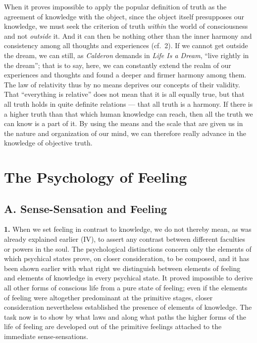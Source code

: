 \documentclass[12pt,a4paper]{book}
\newcommand{\opage}[1]{\marginnote{\footnotesize\textit{[#1]}}}
\begin{document}
When it proves impossible to apply the popular definition of truth as the
agreement of knowledge with the object, since the object itself
presupposes our knowledge, we must seek the criterion of truth
\emph{within} the world of consciousness and not \emph{outside} it. And
it can then be nothing other than the inner harmony and consistency among
all thoughts and experiences (cf.\ 2). If we cannot get outside the
dream, we can still, as \emph{Calderon} demands in \textit{Life Is a
Dream}, ``live rightly in the dream''; that is to say, here, we can
constantly extend the realm of our experiences and thoughts and found a
deeper
\opage{267}and firmer harmony among them. The law of relativity thus by
no means deprives our concepts of their validity. That ``everything is
relative'' does not mean that it is all equally true, but that all truth
holds in quite definite relations --- that all truth is a harmony. If
there is a higher truth than that which human knowledge can reach, then
all the truth we can know is a part of it. By using the means and the
scale that are given us in the nature and organization of our mind, we
can therefore really advance in the knowledge of objective truth.


\chapter[The Psychology of Feeling]{The Psychology of Feeling\opage{268}}
\label{ch:feeling}

\section*{A. Sense-Sensation and Feeling}

\noindent\textbf{1.} When we set feeling in contrast to knowledge, we do
not thereby mean, as was already explained earlier (IV), to assert any
contrast between different faculties or powers in the soul. The
psychological distinctions concern only the elements of which psychical
states prove, on closer consideration, to be composed, and it has been
shown earlier with what right we distinguish between elements of feeling
and elements of knowledge in every psychical state. It proved impossible
to derive all other forms of conscious life from a pure state of
feeling; even if the elements of feeling were altogether predominant at
the primitive stages, closer consideration nevertheless established the
presence of elements of knowledge. The task now is to show by what laws
and along what paths the higher forms of the life of feeling are
developed out of the primitive feelings attached to the immediate
sense-sensations.
\end{document}
